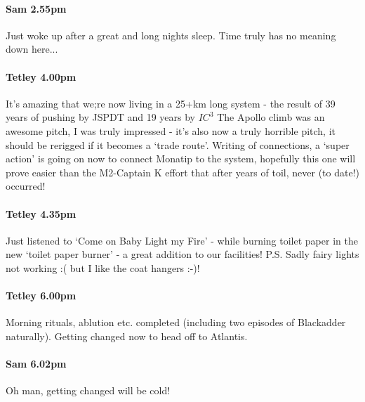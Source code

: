 \paragraph{Sam 2.55pm}
Just woke up after a great and long nights sleep. Time truly has no meaning down here...


\paragraph{Tetley 4.00pm}
It’s amazing that we;re now living in a 25+km long system - the result of 39 years of pushing by JSPDT and 19 years by $IC^3$ The Apollo climb was an awesome pitch, I was truly impressed - it’s also now a truly horrible pitch, it should be rerigged if it becomes a ‘trade route’. Writing of connections, a ‘super action’ is going on now to connect Monatip to the system, hopefully this one will prove easier than the M2-Captain K effort that after years of toil, never (to date!) occurred!


\paragraph{Tetley 4.35pm}
Just listened to ‘Come on Baby Light my Fire’ - while burning toilet paper in the new ‘toilet paper burner’ - a great addition to our facilities!
P.S. Sadly fairy lights not working :( but I like the coat hangers :-)!

\paragraph{Tetley 6.00pm}
Morning rituals, ablution etc. completed (including two episodes of Blackadder naturally). Getting changed now to head off to Atlantis.


\paragraph{Sam 6.02pm}
Oh man, getting changed will be cold!

